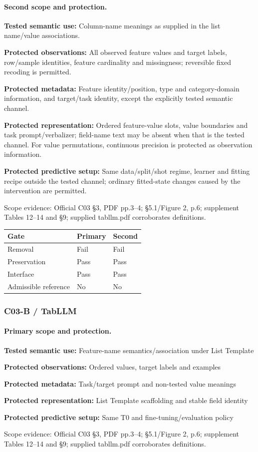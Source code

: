 \documentclass[10pt]{article}
\begin{document}
\paragraph{Second scope and protection.}
\textbf{Tested semantic use:} Column-name meanings as supplied in the list name/value associations.\par
\textbf{Protected observations:} All observed feature values and target labels, row/sample identities, feature cardinality and missingness; reversible fixed recoding is permitted.\par
\textbf{Protected metadata:} Feature identity/position, type and category-domain information, and target/task identity, except the explicitly tested semantic channel.\par
\textbf{Protected representation:} Ordered feature-value slots, value boundaries and task prompt/verbalizer; field-name text may be absent when that is the tested channel. For value permutations, continuous precision is protected as observation information.\par
\textbf{Protected predictive setup:} Same data/split/shot regime, learner and fitting recipe outside the tested channel; ordinary fitted-state changes caused by the intervention are permitted.\par
Scope evidence: Official C03 §3, PDF pp.3--4; §5.1/Figure 2, p.6; supplement Tables 12--14 and §9; supplied tabllm.pdf corroborates definitions.\par
\begin{tabular}{lll}\toprule Gate & Primary & Second \\ \midrule
Removal & Fail & Fail \\
Preservation & Pass & Pass \\
Interface & Pass & Pass \\
Admissible reference & No & No \\
\bottomrule\end{tabular}
\subsubsection*{C03-B / TabLLM}
\paragraph{Primary scope and protection.}
\textbf{Tested semantic use:} Feature-name semantics/association under List Template\par
\textbf{Protected observations:} Ordered values, target labels and examples\par
\textbf{Protected metadata:} Task/target prompt and non-tested value meanings\par
\textbf{Protected representation:} List Template scaffolding and stable field identity\par
\textbf{Protected predictive setup:} Same T0 and fine-tuning/evaluation policy\par
Scope evidence: Official C03 §3, PDF pp.3--4; §5.1/Figure 2, p.6; supplement Tables 12--14 and §9; supplied tabllm.pdf corroborates definitions.\par
\end{document}

